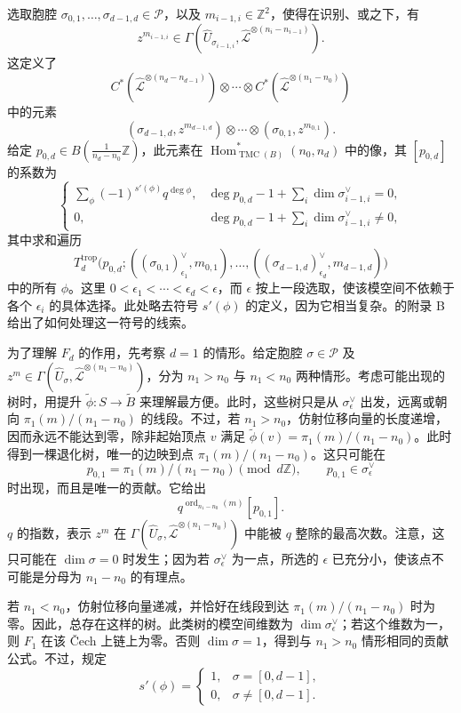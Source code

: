 选取胞腔 $\sigma_{0,1},\ldots,\sigma_{d-1,d}\in\mathcal P$，以及 $m_{i-1,i}\in\mathbb Z^2$，使得在识别、或之下，有
\[
z^{m_{i-1,i}}\in\Gamma(\widehat U_{\sigma_{i-1,i}},
\widehat{\mathcal L}^{\otimes(n_i-n_{i-1})}).
\]
这定义了
\[
C^*(\widehat{\mathcal L}^{\otimes(n_d-n_{d-1})})
\otimes\cdots\otimes C^*(\widehat{\mathcal L}^{\otimes(n_1-n_0)})
\]
中的元素
\[
(\sigma_{d-1,d},z^{m_{d-1,d}})\otimes\cdots\otimes
(\sigma_{0,1},z^{m_{0,1}}).
\]
给定 $p_{0,d}\in B(\frac1{n_d-n_0}\mathbb Z)$，此元素在 $\operatorname{Hom}_{\operatorname{TMC}(B)}^*(n_0,n_d)$ 中的像，其 $[p_{0,d}]$ 的系数为
\[
\begin{cases}
\displaystyle\sum_\phi(-1)^{s'(\phi)}q^{\deg\phi},
&\displaystyle\deg p_{0,d}-1+\sum_i\dim\sigma_{i-1,i}^\vee=0,\\[4pt]
0,&\displaystyle\deg p_{0,d}-1+\sum_i\dim\sigma_{i-1,i}^\vee\ne0,
\end{cases}
\]
其中求和遍历
\[
T_d^{\mathrm{trop}}\bigl(p_{0,d};
((\sigma_{0,1})_{\epsilon_1}^\vee,m_{0,1}),\ldots,
((\sigma_{d-1,d})_{\epsilon_d}^\vee,m_{d-1,d})\bigr)
\]
中的所有 $\phi$。这里 $0<\epsilon_1<\cdots<\epsilon_d<\epsilon$，而 $\epsilon$ 按上一段选取，使该模空间不依赖于各个 $\epsilon_i$ 的具体选择。此处略去符号 $s'(\phi)$ 的定义，因为它相当复杂。的附录 B 给出了如何处理这一符号的线索。

为了理解 $F_d$ 的作用，先考察 $d=1$ 的情形。给定胞腔 $\sigma\in\mathcal P$ 及 $z^m\in\Gamma(\widehat U_\sigma,\widehat{\mathcal L}^{\otimes(n_1-n_0)})$，分为 $n_1>n_0$ 与 $n_1<n_0$ 两种情形。考虑可能出现的树时，用提升 $\widetilde\phi\colon S\to\widetilde B$ 来理解最方便。此时，这些树只是从 $\sigma_\epsilon^\vee$ 出发，远离或朝向 $\pi_1(m)/(n_1-n_0)$ 的线段。不过，若 $n_1>n_0$，仿射位移向量的长度递增，因而永远不能达到零，除非起始顶点 $v$ 满足 $\widetilde\phi(v)=\pi_1(m)/(n_1-n_0)$。此时得到一棵退化树，唯一的边映到点 $\pi_1(m)/(n_1-n_0)$。这只可能在
\[
p_{0,1}=\pi_1(m)/(n_1-n_0)\pmod{d\mathbb Z},
\qquad p_{0,1}\in\sigma_\epsilon^\vee
\]
时出现，而且是唯一的贡献。它给出
\[
q^{\operatorname{ord}_{n_1-n_0}(m)}[p_{0,1}].
\]
$q$ 的指数，表示 $z^m$ 在 $\Gamma(\widehat U_\sigma,\widehat{\mathcal L}^{\otimes(n_1-n_0)})$ 中能被 $q$ 整除的最高次数。注意，这只可能在 $\dim\sigma=0$ 时发生；因为若 $\sigma_\epsilon^\vee$ 为一点，所选的 $\epsilon$ 已充分小，使该点不可能是分母为 $n_1-n_0$ 的有理点。

若 $n_1<n_0$，仿射位移向量递减，并恰好在线段到达 $\pi_1(m)/(n_1-n_0)$ 时为零。因此，总存在这样的树。此类树的模空间维数为 $\dim\sigma_\epsilon^\vee$；若这个维数为一，则 $F_1$ 在该 \v{C}ech 上链上为零。否则 $\dim\sigma=1$，得到与 $n_1>n_0$ 情形相同的贡献公式。不过，规定
\[
s'(\phi)=\begin{cases}
1,&\sigma=[0,d-1],\\
0,&\sigma\ne[0,d-1].
\end{cases}
\]

